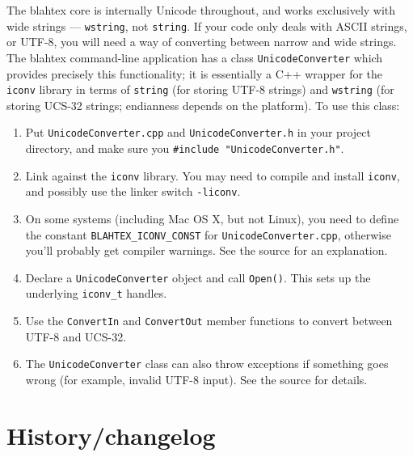 \documentclass{article}
\begin{document}
The blahtex core is internally Unicode throughout, and works exclusively with wide strings --- \texttt{wstring}, not \texttt{string}. If your code only deals with ASCII strings, or UTF-8, you will need a way of converting between narrow and wide strings. The blahtex command-line application has a class \texttt{UnicodeConverter} which provides precisely this functionality; it is essentially a C++ wrapper for the \texttt{iconv} library in terms of \texttt{string} (for storing UTF-8 strings) and \texttt{wstring} (for storing UCS-32 strings; endianness depends on the platform). To use this class:
\begin{enumerate}
\item Put \texttt{UnicodeConverter.cpp} and \texttt{UnicodeConverter.h} in your project directory, and make sure you \texttt{\#include "UnicodeConverter.h"}.
\item Link against the \texttt{iconv} library. You may need to compile and install \texttt{iconv}, and possibly use the linker switch \texttt{-liconv}.
\item On some systems (including Mac OS X, but not Linux), you need to define the constant \texttt{BLAHTEX\_ICONV\_CONST} for \texttt{UnicodeConverter.cpp}, otherwise you'll probably get compiler warnings. See the source for an explanation.
\item Declare a \texttt{UnicodeConverter} object and call \texttt{Open()}. This sets up the underlying \texttt{iconv\_t} handles.
\item Use the \texttt{ConvertIn} and \texttt{ConvertOut} member functions to convert between UTF-8 and UCS-32.
\item The \texttt{UnicodeConverter} class can also throw exceptions if something goes wrong (for example, invalid UTF-8 input). See the source for details.
\end{enumerate}

\section{History/changelog}\label{sec:history}
\end{document}
